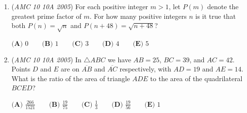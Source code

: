 \begin{enumerate}
$\textbf{(A) } \frac{1}{6} \qquad \textbf{(B) } \frac{1}{4} \qquad \textbf{(C) } \frac{1}{3} \qquad \textbf{(D) } \frac{1}{2} \qquad \textbf{(E) } \frac{2}{3}$


	\item (\textit{AMC 10 10A 2005}) For each positive integer $m > 1$, let $P(m)$ denote the greatest prime factor of $m$. For how many positive integers $n$ is it true that both $P(n) = \sqrt{n}$ and $P(n+48) = \sqrt{n+48}$?


 $\textbf{(A) } 0\qquad \textbf{(B) } 1\qquad \textbf{(C) } 3\qquad \textbf{(D) } 4\qquad \textbf{(E) } 5$


	\item (\textit{AMC 10 10A 2005}) In $\triangle ABC$ we have $AB = 25$, $BC = 39$, and $AC = 42$. Points $D$ and $E$ are on $\overline{AB}$ and $\overline{AC}$ respectively, with $AD = 19$ and $AE = 14$. What is the ratio of the area of triangle $ADE$ to the area of the quadrilateral $BCED$?


 $\textbf{(A) } \frac{266}{1521}\qquad \textbf{(B) } \frac{19}{75}\qquad \textbf{(C) } \frac{1}{3}\qquad \textbf{(D) } \frac{19}{56}\qquad \textbf{(E) } 1$


\end{enumerate}